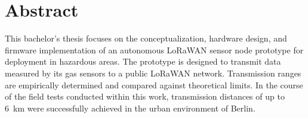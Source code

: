 

\section*{Abstract}
This bachelor's thesis focuses on the conceptualization, hardware design, and firmware implementation of an 
autonomous LoRaWAN sensor node prototype for deployment in hazardous areas. The prototype is designed to transmit 
data measured by its gas sensors to a public LoRaWAN network. Transmission ranges are empirically determined 
and compared against theoretical limits. In the course of the field tests conducted within this work, 
transmission distances of up to \qty{6}{km} were successfully achieved in the urban environment of Berlin.

